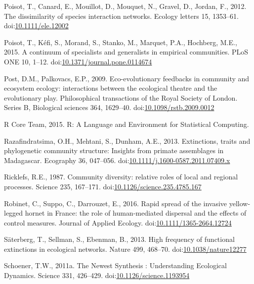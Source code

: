 \hypertarget{ref-Poisot2012}{}
Poisot, T., Canard, E., Mouillot, D., Mouquet, N., Gravel, D., Jordan,
F., 2012. The dissimilarity of species interaction networks. Ecology
letters 15, 1353--61.
doi:\href{https://doi.org/10.1111/ele.12002}{10.1111/ele.12002}

\hypertarget{ref-Poisot2015c}{}
Poisot, T., Kéfi, S., Morand, S., Stanko, M., Marquet, P.A., Hochberg,
M.E., 2015. A continuum of specialists and generalists in empirical
communities. PLoS ONE 10, 1--12.
doi:\href{https://doi.org/10.1371/journal.pone.0114674}{10.1371/journal.pone.0114674}

\hypertarget{ref-Post2009}{}
Post, D.M., Palkovacs, E.P., 2009. Eco-evolutionary feedbacks in
community and ecosystem ecology: interactions between the ecological
theatre and the evolutionary play. Philosophical transactions of the
Royal Society of London. Series B, Biological sciences 364, 1629--40.
doi:\href{https://doi.org/10.1098/rstb.2009.0012}{10.1098/rstb.2009.0012}

\hypertarget{ref-Rcoreteam2015}{}
R Core Team, 2015. R: A Language and Environment for Statistical
Computing.

\hypertarget{ref-Razafindratsima2013}{}
Razafindratsima, O.H., Mehtani, S., Dunham, A.E., 2013. Extinctions,
traits and phylogenetic community structure: Insights from primate
assemblages in Madagascar. Ecography 36, 047--056.
doi:\href{https://doi.org/10.1111/j.1600-0587.2011.07409.x}{10.1111/j.1600-0587.2011.07409.x}

\hypertarget{ref-Ricklefs1987}{}
Ricklefs, R.E., 1987. Community diversity: relative roles of local and
regional processes. Science 235, 167--171.
doi:\href{https://doi.org/10.1126/science.235.4785.167}{10.1126/science.235.4785.167}

\hypertarget{ref-Robinet2016}{}
Robinet, C., Suppo, C., Darrouzet, E., 2016. Rapid spread of the
invasive yellow-legged hornet in France: the role of human-mediated
dispersal and the effects of control measures. Journal of Applied
Ecology.
doi:\href{https://doi.org/10.1111/1365-2664.12724}{10.1111/1365-2664.12724}

\hypertarget{ref-Saterberg2013}{}
Säterberg, T., Sellman, S., Ebenman, B., 2013. High frequency of
functional extinctions in ecological networks. Nature 499, 468--70.
doi:\href{https://doi.org/10.1038/nature12277}{10.1038/nature12277}

\hypertarget{ref-Schoener2011a}{}
Schoener, T.W., 2011a. The Newest Synthesis : Understanding Ecological
Dynamics. Science 331, 426--429.
doi:\href{https://doi.org/10.1126/science.1193954}{10.1126/science.1193954}

